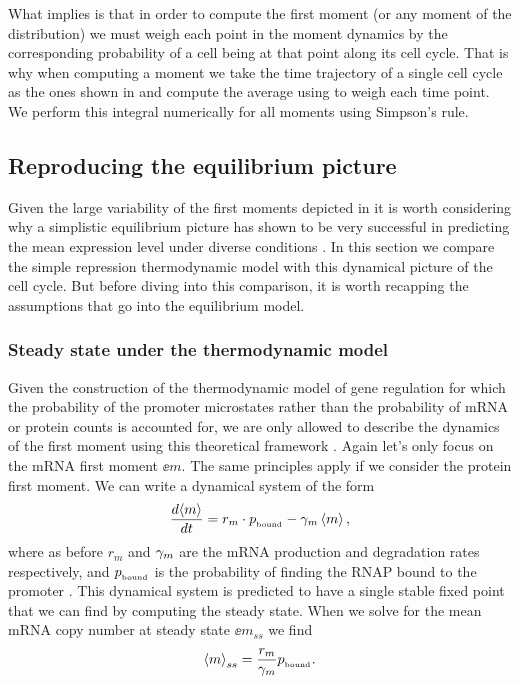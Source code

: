 What  implies is that in order to compute the first moment
(or any moment of the distribution) we must weigh each point in the moment
dynamics by the corresponding probability of a cell being at that point along
its cell cycle. That is why when computing a moment we take the time trajectory
of a single cell cycle as the ones shown in  and
compute the average using  to weigh each time point. We
perform this integral numerically for all moments using Simpson's rule.

\subsection{Reproducing the equilibrium picture}

Given the large variability of the first moments depicted in
 it is worth considering why a simplistic
equilibrium picture has shown to be very successful in predicting the mean
expression level under diverse conditions \cite{Garcia2011c, Brewster2014,
Barnes2019, Razo-Mejia2018}. In this section we compare the simple repression
thermodynamic model with this dynamical picture of the cell cycle. But before
diving into this comparison, it is worth recapping the assumptions that go into
the equilibrium model.

\subsubsection{Steady state under the thermodynamic model}

Given the construction of the thermodynamic model of gene regulation for which
the probability of the promoter microstates rather than the probability of mRNA
or protein counts is accounted for,  we are only allowed to describe the
dynamics of the first moment using this theoretical framework
\cite{Phillips2015}. Again let's only focus on the mRNA first moment $\ee{m}$.
The same principles apply if we consider the protein first moment. We can write
a dynamical system of the form
\begin{equation}
  {d{\left\langle m \right\rangle} \over dt} = r_m \cdot p_{_\text{bound}} - \gamma _m \left\langle m \right\rangle,
\end{equation}
where as before $r_m$ and $\gamma _m$ are the mRNA production and degradation rates
respectively, and $p_{_\text{bound}}$ is the probability of finding the RNAP bound to the
promoter \cite{Bintu2005a}. This dynamical system is predicted to have a single
stable fixed point that we can find by computing the steady state. When we solve
for the mean mRNA copy number at steady state $\ee{m}_{ss}$ we find
\begin{equation}
  \left\langle m \right\rangle_{ss} = {r_m \over \gamma _m} p_{_\text{bound}}.
\end{equation}

